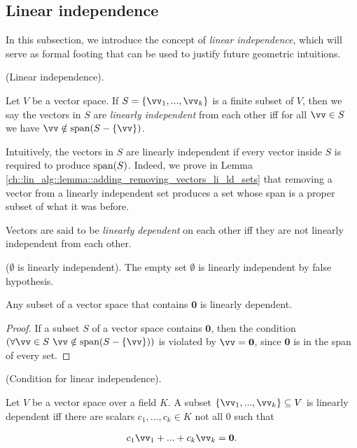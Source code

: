 \newpage

\subsection*{Linear independence}

In this subsection, we introduce the concept of \textit{linear independence}, which will serve as formal footing that can be used to justify future geometric intuitions.

\begin{defn}
    (Linear independence).
    
    Let $V$ be a vector space. If $S = \{\vv_1, ..., \vv_k\}$ is a finite subset of $V$, then we say the vectors in $S$ are \textit{linearly independent} from each other iff for all $\vv \in S$ we have $\vv \notin \spann(S - \{\vv\})$.
    
    Intuitively, the vectors in $S$ are linearly independent if every vector inside $S$ is required to produce $\text{span}(S)$. Indeed, we prove in Lemma \ref{ch::lin_alg::lemma::adding_removing_vectors_li_ld_sets} that removing a vector from a linearly independent set produces a set whose span is a proper subset of what it was before.
    
    Vectors are said to be \textit{linearly dependent} on each other iff they are not linearly independent from each other.
\end{defn}

\begin{remark}
    ($\emptyset$ is linearly independent). The empty set $\emptyset$ is linearly independent by false hypothesis.
\end{remark}

\begin{theorem}
    Any subset of a vector space that contains $\mathbf{0}$ is linearly dependent.
\end{theorem}

\begin{proof}
    If a subset $S$ of a vector space contains $\mathbf{0}$, then the condition $(\forall \vv \in S \spc \vv \notin \spann(S - \{\vv\}))$ is violated by $\vv = \mathbf{0}$, since $\mathbf{0}$ is in the span of every set.
\end{proof}

\begin{theorem}
    (Condition for linear independence).
    
    Let $V$ be a vector space over a field $K$. A subset $\{\vv_1, ..., \vv_k\} \subseteq V$ is linearly dependent iff there are scalars $c_1, ..., c_k \in K$ not all $0$ such that
    
    \begin{align*}
        c_1 \vv_1 + ... + c_k \vv_k = \mathbf{0}.
    \end{align*}
\end{theorem}

